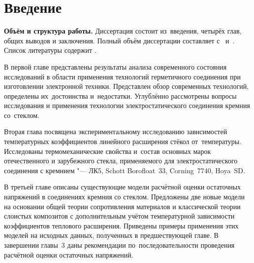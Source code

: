 \chapter*{Введение}							%

\newcommand{\actuality}{\textbf{\actualityTXT}} %
\newcommand{\progress}{}
\newcommand{\aim}{\textbf{\aimTXT}}
\newcommand{\tasks}{\tasksTXT}
\newcommand{\novelty}{\textbf{\noveltyTXT}}
\newcommand{\influence}{\textbf{\influenceTXT}}
\newcommand{\methods}{\textbf{\methodsTXT}}
\newcommand{\defpositions}{\textbf{\defpositionsTXT}}
\newcommand{\reliability}{\textbf{\reliabilityTXT}}
\newcommand{\probation}{\textbf{\probationTXT}}
\newcommand{\contribution}{\textbf{\contributionTXT}}
\newcommand{\publications}{\textbf{\publicationsTXT}}
\newcommand{\realisation}{\textbf{\realisationTXT}}


\textbf{Объём и структура работы.} Диссертация состоит из~введения,
четырёх глав, общих выводов и заключения.
Полный объём диссертации составляет 
с~
и~. Список литературы содержит
.

В первой главе представлены результаты анализа современного
состояния исследований в области применения технологий
герметичного соединения при изготовлении электронной техники.
Представлен обзор современных технологий, определены их~достоинства
и~недостатки.
Углублённо рассмотрены вопросы исследования и применения технологии
электростатического соединения кремния со~стеклом.

Вторая глава посвящена экспериментальному
исследованию зависимостей
температурных коэффициентов линейного расширения стёкол
от~температуры. Исследованы
термомеханические свойства и~состав основных марок отечественного
и зарубежного стекла, применяемого для электростатического соединения
с кремнием "--- ЛК5, Schott Borofloat~33, Corning~7740, Hoya~SD.

В третьей главе описаны существующие модели расчётной оценки
остаточных напряжений в соединениях кремния со стеклом. Предложены две
новые модели на основании общей теории сопротивления материалов
и классической теории слоистых композитов с дополнительным учётом
температурной зависимости коэффициентов теплового расширения.
Приведены примеры применения этих моделей на исходных данных,
полученных в предшествующей главе. В завершении главы~3 даны
рекомендации по~последовательности проведения расчётной оценки
остаточных напряжений.

